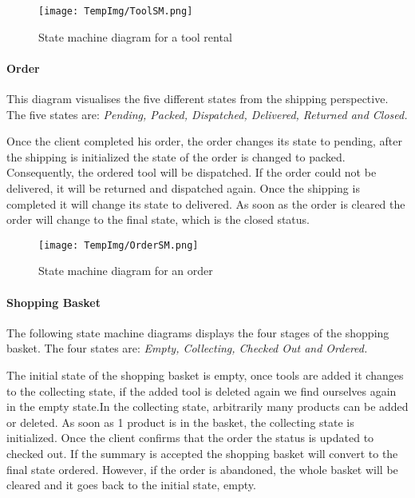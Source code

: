 \documentclass[fontsize=11pt]{extarticle}
\numberwithin{figure}{section} %
\numberwithin{table}{section}%
\let\oldparagraph\paragraph
\renewcommand{\paragraph}[1]{\oldparagraph{#1}\mbox{}}
\begin{document}
\begin{figure}[H]
      \centering
      \texttt{[image: TempImg/ToolSM.png]}
      \caption{State machine diagram for a tool rental}
\end{figure}

\hypertarget{order}{%
\paragraph{Order}\label{order}}

This diagram visualises the five different states from the shipping
perspective. The five states are:
\textit{Pending, Packed, Dispatched, Delivered, Returned and Closed.}

Once the client completed his order, the order changes its state to
pending, after the shipping is initialized the state of the order is
changed to packed. Consequently, the ordered tool will be dispatched. If
the order could not be delivered, it will be returned and dispatched
again. Once the shipping is completed it will change its state to
delivered. As soon as the order is cleared the order will change to the
final state, which is the closed status.

\begin{figure}[H]
      \centering
      \texttt{[image: TempImg/OrderSM.png]}
      \caption{State machine diagram for an order}
\end{figure}

\hypertarget{shopping-basket}{%
\paragraph{Shopping Basket}\label{shopping-basket}}

The following state machine diagrams displays the four stages of the
shopping basket. The four states are:
\textit{Empty, Collecting, Checked Out and Ordered.}

The initial state of the shopping basket is empty, once tools are added
it changes to the collecting state, if the added tool is deleted again
we find ourselves again in the empty state.In the collecting state,
arbitrarily many products can be added or deleted. As soon as 1 product
is in the basket, the collecting state is initialized. Once the client
confirms that the order the status is updated to checked out. If the
summary is accepted the shopping basket will convert to the final state
ordered. However, if the order is abandoned, the whole basket will be
cleared and it goes back to the initial state, empty.
\end{document}
